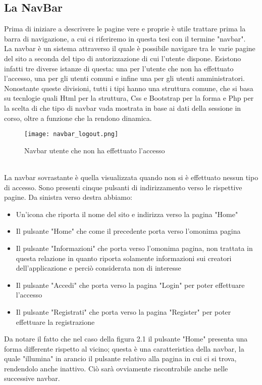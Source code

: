 \documentclass[binding=0.6cm, oneside, noexaminfo, italian]{sapthesis}
\begin{document}
\subsection{La NavBar}
Prima di iniziare a descrivere le pagine vere e proprie è utile trattare prima la barra di navigazione, a cui ci riferiremo in questa tesi con il termine "navbar". \\
La navbar è un sistema attraverso il quale è possibile navigare tra le varie pagine del sito a seconda del tipo di autorizzazione di cui l'utente dispone. Esistono infatti tre diverse istanze di questa: una per l'utente che non ha effettuato l'accesso, una per gli utenti comuni e infine una per gli utenti amministratori.
Nonostante queste divisioni, tutti i tipi hanno una struttura comune, che si basa su tecnlogie quali Html per la struttura, Css e Bootstrap per la forma e Php per la scelta di che tipo di navbar vada mostrata in base ai dati della sessione in corso, oltre a funzione che la rendono dinamica. \\
\begin{figure}[h]
    \centering
    \texttt{[image: navbar\_logout.png]}
    \caption{Navbar utente che non ha effettuato l'accesso}
    \label{fig:navbar_logout}
\end{figure} \\
La navbar sovrastante è quella visualizzata quando non si è effettuato nessun tipo di accesso. Sono presenti cinque pulsanti di indirizzamento verso le rispettive pagine. Da sinistra verso destra abbiamo:
\begin{itemize}
    \item Un'icona che riporta il nome del sito e indirizza verso la pagina "Home"
    \item Il pulsante "Home" che come il precedente porta verso l'omonima pagina
    \item Il pulsante "Informazioni" che porta verso l'omonima pagina, non trattata in questa relazione in quanto riporta solamente informazioni sui creatori dell'applicazione e perciò considerata non di interesse
    \item Il pulsante "Accedi" che porta verso la pagina "Login" per poter effettuare l'accesso
    \item Il pulsante "Registrati" che porta verso la pagina "Register" per poter effettuare la registrazione
\end{itemize}
Da notare il fatto che nel caso della figura 2.1 il pulsante "Home" presenta una forma differente rispetto al vicino; questa è una caratteristica della navbar, la quale "illumina" in arancio il pulsante relativo alla pagina in cui ci si trova, rendendolo anche inattivo. Ciò sarà ovviamente riscontrabile anche nelle successive navbar. \\
\end{document}
